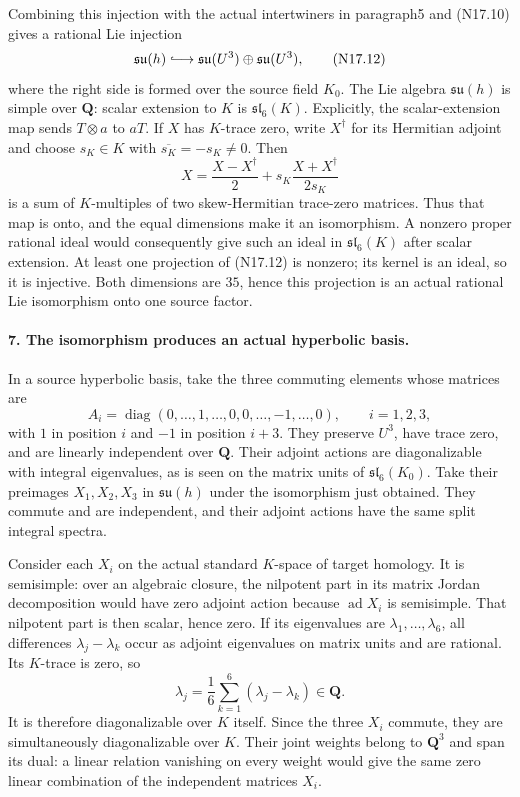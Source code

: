 Combining this injection with the actual intertwiners
in paragraph5 and (N17.10) gives a rational Lie injection
\begin{equation}
 \mathfrak{su}(h)\lhook\joinrel\longrightarrow
 \mathfrak{su}(U^3)\oplus\mathfrak{su}(U^3),           \tag{N17.12}
\end{equation}
where the right side is formed over the source field $K_0$.
The Lie algebra $\mathfrak{su}(h)$ is simple over
$\mathbf Q$: scalar extension to $K$ is
$\mathfrak{sl}_6(K)$. Explicitly, the scalar-extension
map sends $T\otimes a$ to $aT$. If $X$ has $K$-trace
zero, write $X^\dagger$ for its Hermitian adjoint and
choose $s_K\in K$ with $\overline{s_K}=-s_K\ne0$.
Then
\[
 X=\frac{X-X^\dagger}{2}
        +s_K\frac{X+X^\dagger}{2s_K}
\]
is a sum of $K$-multiples of two skew-Hermitian trace-zero
matrices. Thus that map is onto, and the equal dimensions
make it an isomorphism. A nonzero proper rational ideal
would consequently give such an ideal in
$\mathfrak{sl}_6(K)$ after scalar extension.
At least one projection of (N17.12) is nonzero; its
kernel is an ideal, so it is injective. Both dimensions
are $35$, hence this projection is an actual rational
Lie isomorphism onto one source factor.

\paragraph{7. The isomorphism produces an actual hyperbolic basis.}
In a source hyperbolic basis, take the three commuting
elements whose matrices are
\[
 A_i=\operatorname{diag}(0,\ldots,1,\ldots,0,
                        0,\ldots,-1,\ldots,0),
                         \qquad i=1,2,3,
\]
with $1$ in position $i$ and $-1$ in position $i+3$.
They preserve $U^3$, have trace zero, and are linearly
independent over $\mathbf Q$. Their adjoint actions are
diagonalizable with integral eigenvalues, as is seen on
the matrix units of $\mathfrak{sl}_6(K_0)$.
Take their preimages $X_1,X_2,X_3$ in
$\mathfrak{su}(h)$ under the isomorphism just obtained.
They commute and are independent, and their adjoint
actions have the same split integral spectra.

Consider each $X_i$ on the actual standard $K$-space
of target homology. It is semisimple: over an algebraic
closure, the nilpotent part in its matrix Jordan
decomposition would have zero adjoint action because
$\operatorname{ad}X_i$ is semisimple. That nilpotent
part is then scalar, hence zero. If its eigenvalues
are $\lambda_1,\ldots,\lambda_6$, all differences
$\lambda_j-\lambda_k$ occur as adjoint eigenvalues on
matrix units and are rational. Its $K$-trace is zero,
so
\[
           \lambda_j=\frac16\sum_{k=1}^6
                             (\lambda_j-\lambda_k)\in\mathbf Q.
\]
It is therefore diagonalizable over $K$ itself. Since
the three $X_i$ commute, they are simultaneously
diagonalizable over $K$. Their joint weights belong
to $\mathbf Q^3$ and span its dual: a linear relation
vanishing on every weight would give the same zero
linear combination of the independent matrices $X_i$.

